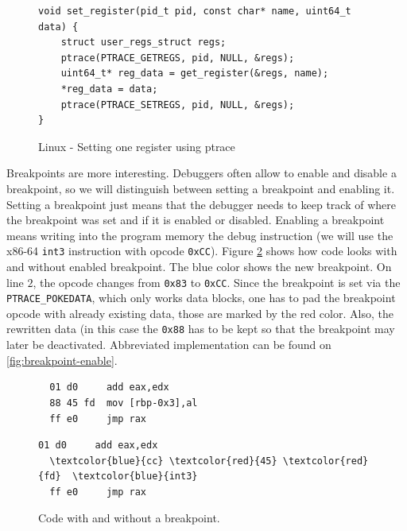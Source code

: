 \begin{figure}
    \begin{verbatim}
void set_register(pid_t pid, const char* name, uint64_t data) {
    struct user_regs_struct regs;
    ptrace(PTRACE_GETREGS, pid, NULL, &regs);
    uint64_t* reg_data = get_register(&regs, name);
    *reg_data = data;
    ptrace(PTRACE_SETREGS, pid, NULL, &regs);
}
    \end{verbatim}
    \caption{Linux - Setting one register using ptrace}
    \label{fig:set-register}
\end{figure}

Breakpoints are more interesting. Debuggers often allow to enable and disable a
breakpoint, so we will distinguish between setting a breakpoint and enabling
it. Setting a breakpoint just means that the debugger needs to keep track of
where the breakpoint was set and if it is enabled or disabled. Enabling a
breakpoint means writing into the program memory the debug instruction (we will
use the x86-64 \texttt{int3} instruction with opcode \texttt{0xCC}). Figure
\ref{fig:with-and-without-bp} shows how code looks with and without enabled
breakpoint. The blue color shows the new breakpoint. On line $2$, the opcode
changes from \texttt{0x83} to \texttt{0xCC}. Since the breakpoint is set via
the \texttt{PTRACE\_POKEDATA}, which only works data blocks, one has to pad the
breakpoint opcode with already existing data, those are marked by the red
color. Also, the rewritten data (in this case the \texttt{0x88} has to be kept
so that the breakpoint may later be deactivated. Abbreviated implementation can
be found on \ref{fig:breakpoint-enable}.

\begin{figure}
    \begin{minipage}{0.45\textwidth}
        \begin{Verbatim}
  01 d0     add eax,edx
  88 45 fd  mov [rbp-0x3],al
  ff e0     jmp rax
        \end{Verbatim}
    \end{minipage}
    \hfill\vline\hfill
    \begin{minipage}{0.45\textwidth}
        \begin{Verbatim}[commandchars=\\\{\}]
  01 d0     add eax,edx
  \textcolor{blue}{cc} \textcolor{red}{45} \textcolor{red}{fd}  \textcolor{blue}{int3}
  ff e0     jmp rax
        \end{Verbatim}
    \end{minipage}
    \caption{Code with and without a breakpoint.}
    \label{fig:with-and-without-bp}
\end{figure}

